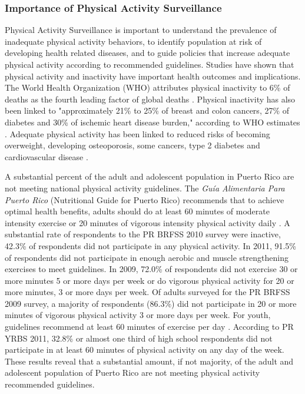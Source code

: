 \documentclass[12pt,letterpaper]{report}
\begin{document}
\subsubsection{Importance of Physical Activity Surveillance}
Physical Activity Surveillance is important to understand the prevalence of inadequate physical activity behaviors, to identify population at risk of developing health related diseases, and to guide policies that increase adequate physical activity according to recommended guidelines. Studies have shown that physical activity and inactivity have important health outcomes and implications. The World Health Organization (WHO) attributes physical inactivity to 6\% of deaths as the fourth leading factor of global deaths \cite{mathers2009global}. Physical inactivity has also been linked to "approximately 21\% to 25\% of breast and colon cancers, 27\% of diabetes and 30\% of ischemic heart disease burden," according to WHO estimates \cite{mathers2009global}. Adequate physical activity has been linked to reduced risks of becoming overweight, developing osteoporosis, some cancers, type 2 diabetes and cardiovascular disease \cite{healy2008objectively, kushi2006american, bassuk2005epidemiological, lifshitz2002reduction} .

A substantial percent of the adult and adolescent population in Puerto Rico are not meeting national physical activity guidelines. The \textit{Gu\'{i}a Alimentaria Para Puerto Rico} (Nutritional Guide for Puerto Rico) recommends that to achieve optimal health benefits, adults should do at least 60 minutes of moderate intensity exercise or 20 minutes of vigorous intensity physical activity daily \cite{GuiaAlimentariaPR}. A substantial rate of respondents to the PR BRFSS 2010 survey were inactive, 42.3\% of respondents did not participate in any physical activity. In 2011, 91.5\% of respondents did not participate in enough aerobic and muscle strengthening exercises to meet guidelines. In 2009, 72.0\% of respondents did not exercise 30 or more minutes 5 or more days per week or do vigorous physical activity for 20 or more minutes, 3 or more days per week. Of adults surveyed for the PR BRFSS 2009 survey, a majority of respondents (86.3\%) did not participate in 20 or more minutes of vigorous physical activity 3 or more days per week. For youth, guidelines recommend at least 60 minutes of exercise per day \cite{GuiaAlimentariaPR}. According to PR YRBS 2011, 32.8\% or almost one third of high school respondents did not participate in at least 60 minutes of physical activity on any day of the week. These results reveal that a substantial amount, if not majority, of the adult and adolescent population of Puerto Rico are not meeting physical activity recommended guidelines.
\end{document}
